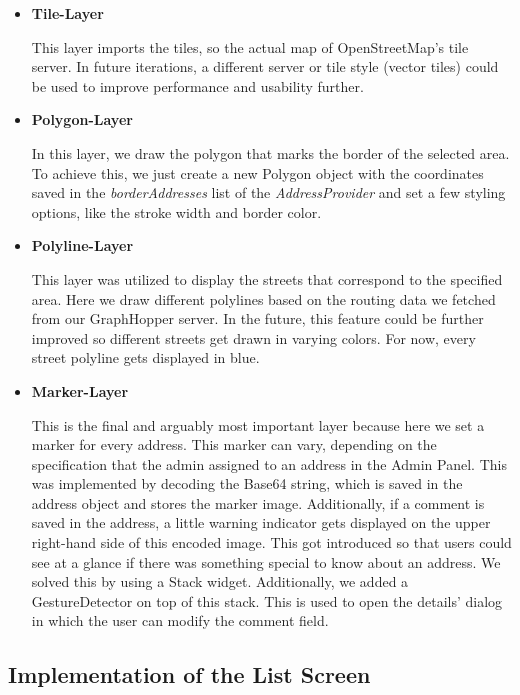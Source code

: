 \begin{itemize}
  \item \textbf{Tile-Layer}
  
  This layer imports the tiles, so the actual map of OpenStreetMap's tile server. In future iterations, a different server or tile style (vector tiles) could be used to improve performance and usability further.

  \item \textbf{Polygon-Layer}
  
  In this layer, we draw the polygon that marks the border of the selected area. To achieve this, we just create a new Polygon object with the coordinates saved in the \textit{borderAddresses} list of the \textit{AddressProvider} and set a few styling options, like the stroke width and border color.

  \item \textbf{Polyline-Layer}
  
  This layer was utilized to display the streets that correspond to the specified area. Here we draw different polylines based on the routing data we fetched from our GraphHopper server. In the future, this feature could be further improved so different streets get drawn in varying colors. For now, every street polyline gets displayed in blue. 

  \item \textbf{Marker-Layer}
  
  This is the final and arguably most important layer because here we set a marker for every address. This marker can vary, depending on the specification that the admin assigned to an address in the Admin Panel. This was implemented by decoding the Base64 string, which is saved in the address object and stores the marker image. Additionally, if a comment is saved in the address, a little warning indicator gets displayed on the upper right-hand side of this encoded image. This got introduced so that users could see at a glance if there was something special to know about an address. We solved this by using a Stack widget. Additionally, we added a GestureDetector on top of this stack. This is used to open the details' dialog in which the user can modify the comment field. 
\end{itemize}

\subsection{Implementation of the List Screen}


